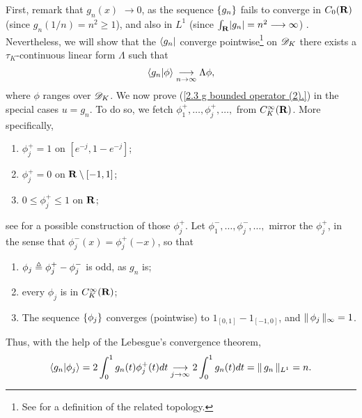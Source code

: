 %
First, remark that $g_n(x)$ $\longrightarrow 0$, %
as the sequence $\singleton{g_n}$ fails to converge in $C_0(\R)$ %
%
  (since $g_n(1/n)= n^2 \geq 1$),  %
%
and also in $L^1$ %
%
  (since $\int_\R \lvert g_n \rvert = n^2 \longrightarrow{\infty}$)
. %
Nevertheless, we will show that %
%
  the $\bra{g_n}$ %
%
converge pointwise\footnote{
%
  See  for a definition of the related topology. %
%
} on $\D_K$ %
\ie %
there exists a $\tau_K$-continuous linear form $\Lambda$ such that %
%
  \begin{align}\label{2.3. Convergence in D_K, not vague.}
    \bra{g_n}\ket{\phi} \tendsto{n}{\infty} \Lambda \phi, %
  \end{align}
%
where $\phi$ ranges over $\D_K$. %
%
We now prove (\ref{2.3  g  bounded operator (2).}) in the special cases %
%
  $u = g_n$. %
%
To do so, we fetch %
%
  $\phi^{+}_{1}, \dots, \phi^{+}_{j}, \dots,$ from $C_K^\infty(\R)$. %
%
More specifically, %
%
  \begin{enumerate}
    \item{
      $\phi^{+}_{j} = 1$ on $[e^{\minus j}, 1-e^{\minus j}]$; 
    }%
    \item{
      $\phi^{+}_{j} = 0$ on $\R\setminus [-1, 1]$;%
    }
    \item{
      $0 \leq \phi^{+}_{j} \leq 1$ on $\R$; %
    }
  \end{enumerate}
%
see \citeresultFA{[1.46]} for a possible construction of those $\phi^{+}_{j}$. 
%
Let %
%
  $\phi^{-}_{1}, \dots, \phi^{-}_{j}, \dots,$ %
%
mirror the $\phi^{+}_{j}$, in the sense that %
%
  $\phi^{-}_{j}(x) = \phi^{+}_{j}(\minus x)$, %
%
so that %
%
  \begin{enumerate}\addtocounter{enumi}{3}
    \item{
      $\phi_{j} \Def \phi^{+}_{j} - \phi^{-}_{j}$ is odd, as $g_n$ is;
    }
    \item{
      every $\phi_{j}$ is in $C_K^\infty(\R)$;
    }
    \item{
      The sequence $\singleton{\phi_j}$ converges (pointwise) to %
      $1_{[0, 1]} - 1_{[\minus 1, 0]}$, and $\norm{\infty}{\phi_{j}} = 1$. %
    }
  \end{enumerate}
%
Thus, with the help of the Lebesgue's convergence theorem, 
%
  \begin{align}\label{2.3. Norm in the dual equals norm L1 (1).}
      \langle{g_n}\lvert{\phi_j}\rangle
      = 
    2 \int_{0}^1 g_n(t) \phi^{+}_{j}(t) d t
      \tendsto{j}{\infty} 
    2 \int_{0}^1 g_n(t) d t
      = \norm{L^1}{g_n} = n.
  \end{align}
